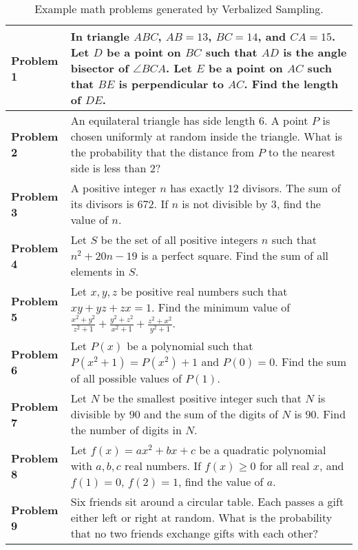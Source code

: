 \begin{table}[h]
\centering
\caption{Example math problems generated by Verbalized Sampling.}
\label{tab:math_examples}
\begin{tabular}{p{}p{}}
\toprule
\textbf{Problem 1} & In triangle $ABC$, $AB=13$, $BC=14$, and $CA=15$. Let $D$ be a point on $BC$ such that $AD$ is the angle bisector of $\angle BCA$. Let $E$ be a point on $AC$ such that $BE$ is perpendicular to $AC$. Find the length of $DE$. \\
\hline
\textbf{Problem 2} & An equilateral triangle has side length $6$. A point $P$ is chosen uniformly at random inside the triangle. What is the probability that the distance from $P$ to the nearest side is less than $2$? \\
\hline
\textbf{Problem 3} & A positive integer $n$ has exactly $12$ divisors. The sum of its divisors is $672$. If $n$ is not divisible by $3$, find the value of $n$. \\
\hline
\textbf{Problem 4} & Let $S$ be the set of all positive integers $n$ such that $n^2+20n-19$ is a perfect square. Find the sum of all elements in $S$. \\
\hline
\textbf{Problem 5} & Let $x, y, z$ be positive real numbers such that $xy+yz+zx=1$. Find the minimum value of $\frac{x^2+y^2}{z^2+1}+\frac{y^2+z^2}{x^2+1}+\frac{z^2+x^2}{y^2+1}$. \\
\hline
\textbf{Problem 6} & Let $P(x)$ be a polynomial such that $P(x^2+1)=P(x^2)+1$ and $P(0)=0$. Find the sum of all possible values of $P(1)$. \\
\hline
\textbf{Problem 7} & Let $N$ be the smallest positive integer such that $N$ is divisible by $90$ and the sum of the digits of $N$ is $90$. Find the number of digits in $N$. \\
\hline
\textbf{Problem 8} & Let $f(x)=ax^2+bx+c$ be a quadratic polynomial with $a, b, c$ real numbers. If $f(x) \geq 0$ for all real $x$, and $f(1)=0$, $f(2)=1$, find the value of $a$. \\
\hline
\textbf{Problem 9} & Six friends sit around a circular table. Each passes a gift either left or right at random. What is the probability that no two friends exchange gifts with each other? \\
\bottomrule
\end{tabular}
\end{table}